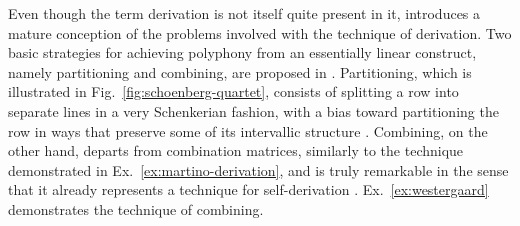 Even though the term derivation is not itself quite present in it, \cite{Westergaard1966} introduces a mature conception of the problems involved with the technique of derivation. Two basic strategies for achieving polyphony from an essentially linear construct, namely partitioning and combining, are proposed in \cite[95]{Westergaard1966}. Partitioning, which is illustrated in Fig.~\ref{fig:schoenberg-quartet}, consists of splitting a row into separate lines in a very Schenkerian fashion, with a bias toward partitioning the row in ways that preserve some of its intervallic structure \cite[100]{Westergaard1966}. Combining, on the other hand, departs from combination matrices, similarly to the technique demonstrated in Ex.~\ref{ex:martino-derivation}, and is truly remarkable in the sense that it already represents a technique for self-derivation \cite[101]{Westergaard1966}. Ex.~\ref{ex:westergaard} demonstrates the technique of combining.


